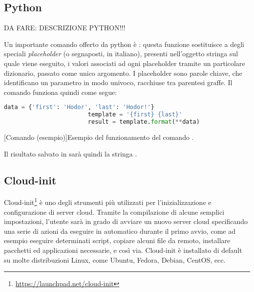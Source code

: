         \subsection{Python} \label{subsec:p;sl;python}
        
            DA FARE: DESCRIZIONE PYTHON!!!
        
            Un importante comando offerto da python è : questa funzione sostituisce a degli speciali \textit{placeholder} (o segnaposti, in italiano), presenti nell'oggetto stringa sul quale viene eseguito, i valori associati ad ogni placeholder tramite un particolare dizionario, passato come unico argomento. I placeholder sono parole chiave, che identificano un parametro in modo univoco, racchiuse tra parentesi graffe. Il comando  funziona quindi come segue:
            
            \begin{center}
                \begin{minipage}{\linewidth}
                    \begin{lstlisting}[language=python, gobble=22]
                        data = {'first': 'Hodor', 'last': 'Hodor!'}
                        template = '{first} {last}'
                        result = template.format(**data)
                    \end{lstlisting}
                    \captionsetup{textformat=empty,labelformat=empty} \vspace{-2em}
                    [Comando  (esempio)]{Esempio del funzionamento del comando .}
                \end{minipage}
            \end{center}
            
            Il risultato salvato in  sarà quindi la stringa .
        
        \subsection{Cloud-init} \label{subsec:p;sl;cloud-init}
        
            Cloud-init\footnote{\url{https://launchpad.net/cloud-init}} è uno degli strumenti più utilizzati per l'inizializzazione e configurazione di server cloud. Tramite la compilazione di alcune semplici impostazioni, l'utente sarà in grado di avviare un nuovo server cloud specificando una serie di azioni da eseguire in automatico durante il primo avvio, come ad esempio eseguire determinati script, copiare alcuni file da remoto, installare pacchetti ed applicazioni necessarie, e così via. Cloud-init è installato di default su molte distribuzioni Linux, come Ubuntu, Fedora, Debian, CentOS, ecc. \cite{cloud-init:readthedocs}
            

